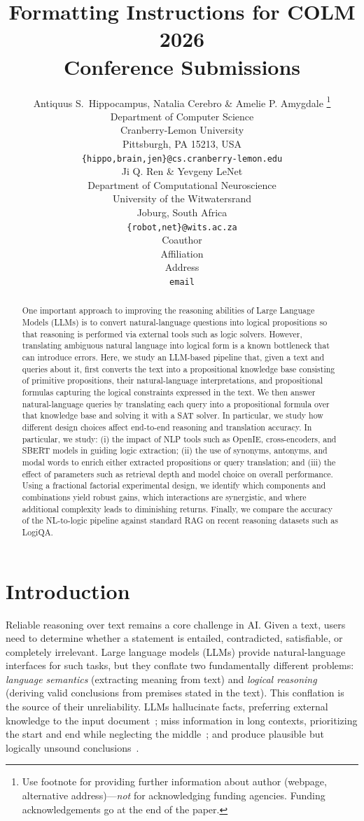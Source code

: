 \documentclass{article} %
\title{Formatting Instructions for COLM 2026 \\ Conference Submissions
}
\author{Antiquus S.~Hippocampus, Natalia Cerebro \& Amelie P. Amygdale \thanks{ Use footnote for providing further information
about author (webpage, alternative address)---\emph{not} for acknowledging
funding agencies.  Funding acknowledgements go at the end of the paper.} \\
Department of Computer Science\\
Cranberry-Lemon University\\
Pittsburgh, PA 15213, USA \\
\texttt{\{hippo,brain,jen\}@cs.cranberry-lemon.edu} \\
\And
Ji Q. Ren \& Yevgeny LeNet \\
Department of Computational Neuroscience \\
University of the Witwatersrand \\
Joburg, South Africa \\
\texttt{\{robot,net\}@wits.ac.za} \\
\AND
Coauthor \\
Affiliation \\
Address \\
\texttt{email}
}
\begin{document}
\ifcolmsubmission
\linenumbers
\fi

\maketitle

\begin{abstract}
One important approach to improving the reasoning abilities of Large Language Models (LLMs) is to convert natural-language questions into logical propositions so that reasoning is performed via external tools such as logic solvers. However, translating ambiguous natural language into logical form is a known bottleneck that can introduce errors. Here, we study an LLM-based pipeline that, given a text and queries about it, first converts the text into a propositional knowledge base consisting of primitive propositions, their natural-language interpretations, and propositional formulas capturing the logical constraints expressed in the text. We then answer natural-language queries by translating each query into a propositional formula over that knowledge base and solving it with a SAT solver.
In particular, we study how different design choices affect end-to-end reasoning and translation accuracy. In particular, we study: (i) the impact of NLP tools such as OpenIE, cross-encoders, and SBERT models in guiding logic extraction; (ii) the use of synonyms, antonyms, and modal words to enrich either extracted propositions or query translation; and (iii) the effect of parameters such as retrieval depth and model choice on overall performance. Using a fractional factorial experimental design, we identify which components and combinations yield robust gains, which interactions are synergistic, and where additional complexity leads to diminishing returns. Finally, we compare the accuracy of the NL-to-logic pipeline against standard RAG on recent reasoning datasets such as LogiQA.

\end{abstract}

\section{Introduction}

Reliable reasoning over text remains a core challenge in AI. Given a text, users need to determine whether a statement is entailed, contradicted, satisfiable, or completely irrelevant. Large language models (LLMs) provide natural-language interfaces for such tasks, but they conflate two fundamentally different problems: \emph{language semantics} (extracting meaning from text) and \emph{logical reasoning} (deriving valid conclusions from premises stated in the text). This conflation is the source of their unreliability. LLMs hallucinate facts, preferring external knowledge to the input document~\citep{ji2023hallucination}; miss information in long contexts, prioritizing the start and end while neglecting the middle~\citep{liu2024lost}; and produce plausible but logically unsound conclusions~\citep{huang2023reasoning}.
\end{document}

